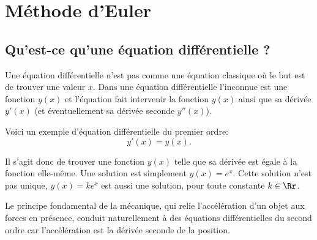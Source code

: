\documentclass[11pt,class=report,crop=false]{standalone}
\begin{document}

%
%
%





\section{Méthode d'Euler}

\subsection{Qu'est-ce qu'une équation différentielle ?}

Une équation différentielle n'est pas comme une équation classique où le but est de trouver une valeur $x$. 
Dans une équation différentielle l'inconnue est une fonction $y(x)$ et l'équation fait intervenir la fonction $y(x)$ ainsi que sa dérivée $y'(x)$ (et éventuellement sa dérivée seconde $y''(x)$). 

Voici un exemple d'équation différentielle du premier ordre:
$$y'(x) = y(x).$$

Il s'agit donc de trouver une fonction $y(x)$ telle que sa dérivée est égale à la fonction elle-même.
Une solution est simplement $y(x)= e^x$. Cette solution n'est pas unique, $y(x) = k e^x$ est aussi une solution, pour toute constante $k \in \Rr$.

Le principe fondamental de la mécanique, qui relie l'accélération d'un objet aux forces en présence, conduit naturellement à des équations différentielles du second ordre car l'accélération est la dérivée seconde de la position.
\end{document}
